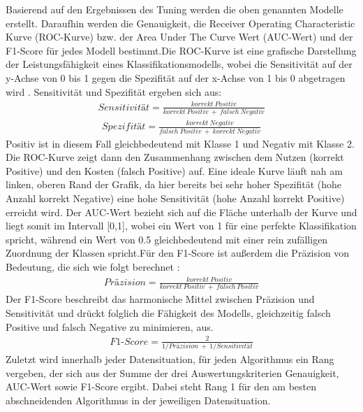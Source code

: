 \documentclass[
]{article}
\begin{document}
Basierend auf den Ergebnissen des Tuning werden die oben genannten
Modelle erstellt. Daraufhin werden die Genauigkeit, die Receiver
Operating Characteristic Kurve (ROC-Kurve) bzw. der Area Under The Curve
Wert (AUC-Wert) und der F1-Score für jedes Modell bestimmt.\newline Die
ROC-Kurve ist eine grafische Darstellung der Leistungsfähigkeit eines
Klassifikationsmodells, wobei die Sensitivität auf der y-Achse von 0 bis
1 gegen die Spezifität auf der x-Achse von 1 bis 0 abgetragen wird
\parencite{fawcettIntroductionROCAnalysis2006}. Sensitivität und
Spezifität ergeben sich aus: \begin{align}
Sensitivität=\frac{korrekt~Positiv}{korrekt~Positiv~+~falsch~Negativ}
\end{align} \begin{align}
Spezifität=\frac{korrekt~Negativ}{falsch~Positiv~+~korrekt~Negativ}
\end{align} Positiv ist in diesem Fall gleichbedeutend mit Klasse 1 und
Negativ mit Klasse 2. Die ROC-Kurve zeigt dann den Zusammenhang zwischen
dem Nutzen (korrekt Positive) und den Kosten (falsch Positive) auf. Eine
ideale Kurve läuft nah am linken, oberen Rand der Grafik, da hier
bereits bei sehr hoher Spezifität (hohe Anzahl korrekt Negative) eine
hohe Sensitivität (hohe Anzahl korrekt Positive) erreicht wird. Der
AUC-Wert bezieht sich auf die Fläche unterhalb der Kurve und liegt somit
im Intervall {[}0,1{]}, wobei ein Wert von 1 für eine perfekte
Klassifikation spricht, während ein Wert von 0.5 gleichbedeutend mit
einer rein zufälligen Zuordnung der Klassen spricht.\newline Für den
F1-Score ist außerdem die Präzision von Bedeutung, die sich wie folgt
berechnet \parencite{fawcettIntroductionROCAnalysis2006}: \begin{align}
Präzision=\frac{korrekt~Positiv}{korrekt~Positiv~+~falsch~Positiv}
\end{align} Der F1-Score beschreibt das harmonische Mittel zwischen
Präzision und Sensitivität und drückt folglich die Fähigkeit des
Modells, gleichzeitig falsch Positive und falsch Negative zu minimieren,
aus. \begin{align}
F1\text{-}Score=\frac{2}{1/Präzision~+~1/Sensitivität}
\end{align}\newline Zuletzt wird innerhalb jeder Datensituation, für
jeden Algorithmus ein Rang vergeben, der sich aus der Summe der drei
Auswertungskriterien Genauigkeit, AUC-Wert sowie F1-Score ergibt. Dabei
steht Rang 1 für den am besten abschneidenden Algorithmus in der
jeweiligen Datensituation.
\end{document}
